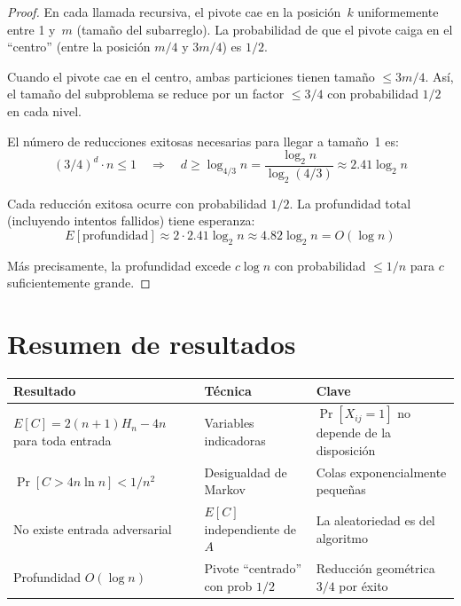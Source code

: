 \documentclass[11pt, letterpaper]{article}
\theoremstyle{definition}
\theoremstyle{plain}
\theoremstyle{remark}
\begin{document}
\begin{proof}
En cada llamada recursiva, el pivote cae en la posición~$k$
uniformemente entre 1 y~$m$ (tamaño del subarreglo). La probabilidad
de que el pivote caiga en el ``centro'' (entre la posición $m/4$ y
$3m/4$) es $1/2$.

Cuando el pivote cae en el centro, ambas particiones tienen tamaño
$\leq 3m/4$. Así, el tamaño del subproblema se reduce por un factor
$\leq 3/4$ con probabilidad $1/2$ en cada nivel.

El número de reducciones exitosas necesarias para llegar a tamaño~1
es:
\[
  (3/4)^d \cdot n \leq 1
  \quad\Longrightarrow\quad
  d \geq \log_{4/3} n
  = \frac{\log_2 n}{\log_2(4/3)}
  \approx 2.41 \log_2 n
\]

Cada reducción exitosa ocurre con probabilidad $1/2$. La profundidad
total (incluyendo intentos fallidos) tiene esperanza:
\[
  E[\text{profundidad}] \approx 2 \cdot 2.41 \log_2 n
  \approx 4.82 \log_2 n = O(\log n)
\]

Más precisamente, la profundidad excede $c\log n$ con probabilidad
$\leq 1/n$ para $c$ suficientemente grande.
\end{proof}

\section{Resumen de resultados}

\begin{table}[h]
\centering
\begin{tabular}{llp{5.5cm}}
\toprule
\textbf{Resultado} & \textbf{Técnica} & \textbf{Clave} \\
\midrule
$E[C] = 2(n{+}1)H_n - 4n$ para toda entrada
  & Variables indicadoras
  & $\Pr[X_{ij}{=}1]$ no depende de la disposición \\
$\Pr[C > 4n\ln n] < 1/n^2$
  & Desigualdad de Markov
  & Colas exponencialmente pequeñas \\
No existe entrada adversarial
  & $E[C]$ independiente de $A$
  & La aleatoriedad es del algoritmo \\
Profundidad $O(\log n)$
  & Pivote ``centrado'' con prob $1/2$
  & Reducción geométrica $3/4$ por éxito \\
\bottomrule
\end{tabular}
\end{table}
\end{document}

